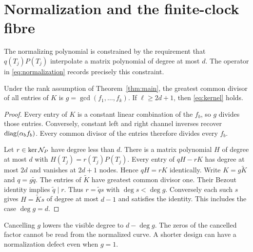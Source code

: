 \section{Normalization and the finite-clock fibre}
\label{sec:polynomial}
The normalizing polynomial is constrained by the requirement that
$q(T_j)P(T_j)$ interpolate a matrix polynomial of degree at most $d$.
The operator in \eqref{eq:normalization} records precisely this constraint.

\begin{lemma}\label{lem:defect}
Under the rank assumption of Theorem~\ref{thm:main}, the greatest common
divisor of all entries of $K$ is $g=\gcd(f_1,\ldots,f_k)$. If
$\ell\ge2d+1$, then \eqref{eq:kernel} holds.
\end{lemma}
\begin{proof}
Every entry of $K$ is a constant linear combination of the $f_b$, so
$g$ divides those entries. Conversely, constant left and right channel
inverses recover $\operatorname{diag}(\alpha_b f_b)$. Every common divisor of the
entries therefore divides every $f_b$.

Let $r\in\ker\mathcal N_P$ have degree less than $d$. There is a matrix
polynomial $H$ of degree at most $d$ with $H(T_j)=r(T_j)P(T_j)$.
Every entry of $qH-rK$ has degree at most $2d$ and vanishes at $2d+1$
nodes. Hence $qH=rK$ identically. Write $K=g\widetilde K$ and
$q=g\widetilde q$. The entries of $\widetilde K$ have greatest common
divisor one. Their Bezout identity implies $\widetilde q\mid r$.
Thus $r=\widetilde q s$ with $\deg s<\deg g$. Conversely each such
$s$ gives $H=\widetilde K s$ of degree at most $d-1$ and satisfies
the identity. This includes the case $\deg g=d$.
\end{proof}

Cancelling $g$ lowers the visible degree to $d-\deg g$. The zeros of
the cancelled factor cannot be read from the normalized curve. A shorter
design can have a normalization defect even when $g=1$.

